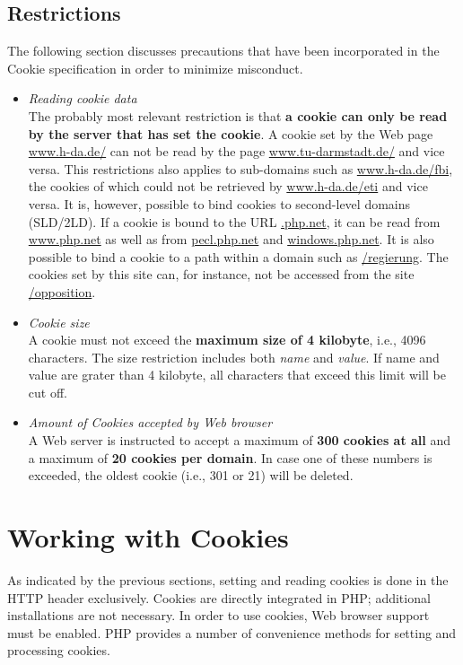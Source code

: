 \documentclass[a4paper, justified, notoc]{tufte-handout} %
\begin{document}
\subsection{Restrictions} %
\label{sub:limitations}
The following section discusses precautions that have been incorporated in the Cookie specification in order to minimize misconduct.

\begin{itemize}
	\item \emph{Reading cookie data} \\ The probably most relevant restriction is that \textbf{a cookie can only be read by the server that has set the cookie}. 
A cookie set by the Web page \url{www.h-da.de/} can not be read by the page \url{www.tu-darmstadt.de/} and vice versa. This restrictions also applies to sub-domains such as \url{www.h-da.de/fbi}, the cookies of which could not be retrieved by \url{www.h-da.de/eti} and vice versa. 
It is, however, possible to bind cookies to second-level domains (SLD/2LD).
If a cookie is bound to the URL \url{.php.net}, it can be read from \url{www.php.net} as well as from \url{pecl.php.net} and \url{windows.php.net}.
It is also possible to bind a cookie to a path within a domain such as \url{/regierung}. The cookies set by this site can, for instance, not be accessed from the site \url{/opposition}.

\item \emph{Cookie size} \\ A cookie must not exceed the \textbf{maximum size of 4 kilobyte}, i.e., 4096 characters. The size restriction includes both \emph{name} and \emph{value}. If name and value are grater than 4 kilobyte, all characters that exceed this limit will be cut off. 

\item \emph{Amount of Cookies accepted by Web browser} \\ A Web server is instructed to accept a maximum of \textbf{300 cookies at all} and a maximum of \textbf{20 cookies per domain}. In case one of these numbers is exceeded, the oldest cookie (i.e., 301 or 21) will be deleted.    
\end{itemize}



\section{Working with Cookies } %
\label{sec:working_with_cookies}
As indicated by the previous sections, setting and reading cookies is done in the HTTP header exclusively. 
Cookies are directly integrated in PHP; additional installations are not necessary. 
In order to use cookies, Web browser support must be enabled.
PHP provides a number of convenience methods for setting and processing cookies.
\end{document}

